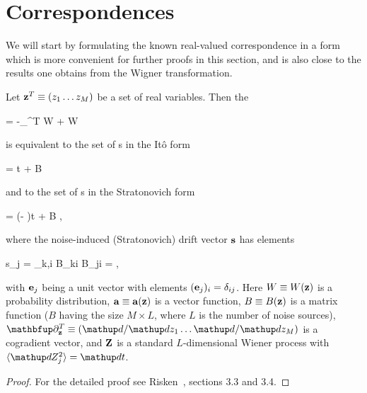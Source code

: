 \section{Correspondences}

We will start by formulating the known real-valued correspondence in a form which is more convenient for further proofs in this section, and is also close to the results one obtains from the Wigner transformation.

\begin{lemma}
\label{lmm:fpe-sde:corr:fpe-sde-real}
	Let $\mathbf{z}^T \equiv (z_1 \ldots z_M)$ be a set of real variables.
	Then the 
	\begin{eqn*}
		= -\vcwd_{\zvec}^T \cdot \avec W
		+   W
	\end{eqn*}
	is equivalent to the set of s in the It\^o form
	\begin{eqn*}
		\upd\zvec = \avec \upd t + B \upd\Zvec
	\end{eqn*}
	and to the set of s in the Stratonovich form
	\begin{eqn*}
		\upd\zvec = (\avec - \svec)\upd t + B \upd\Zvec,
	\end{eqn*}
	where the noise-induced (Stratonovich) drift vector $\mathbf{s}$ has elements
	\begin{eqn*}
		s_j
		=  \sum_{k,i} B_{ki}  B_{ji}
		=  \Trace{B^T \vcwd_{\zvec} \evec_j^T B},
	\end{eqn*}
	with $\mathbf{e}_j$ being a unit vector with elements $(\mathbf{e}_j)_i = \delta_{ij}$.
	Here $W \equiv W(\mathbf{z})$ is a probability distribution, $\mathbf{a} \equiv \mathbf{a}(\mathbf{z})$ is a vector function, $B \equiv B(\mathbf{z})$ is a matrix function ($B$ having the size $M \times L$, where $L$ is the number of noise sources), $\vcwd_{\zvec}^T \equiv (\upd/\upd z_1 \ldots \upd/\upd z_M)$ is a cogradient vector, and $\mathbf{Z}$ is a standard $L$-dimensional Wiener process with $\langle \upd Z_j^2 \rangle = \upd t$.
\end{lemma}
\begin{proof}
For the detailed proof see Risken~\cite{Risken1996}, sections 3.3 and 3.4.
\end{proof}

